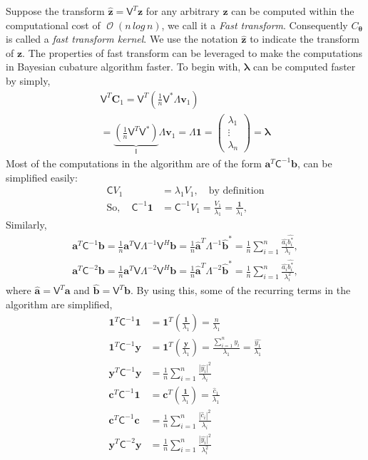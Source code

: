\documentclass[twocolumn]{svjour3}          %
\DeclareMathOperator{\Order}{{\mathcal O}}
\newcommand{\bm}[1]{\boldsymbol{#1}}
\newcommand{\vlambda}{{\bm{\lambda}}}
\newcommand{\vtheta}{{\bm{\theta}}}
\newcommand{\va}{\bm{a}}
\newcommand{\vb}{\bm{b}}
\newcommand{\vc}{\bm{c}}
\newcommand{\vC}{\bm{C}}
\newcommand{\vv}{\bm{v}}
\newcommand{\vy}{\bm{y}}
\newcommand{\vz}{\bm{z}}
\newcommand{\vone}{\bm{1}}
\newcommand{\mC}{\mathsf{C}}
\newcommand{\mCInv}{{\mathsf{C}^{-1}}}
\newcommand{\mLambda}{\mathsf{\Lambda}}
\newcommand{\mLambdaInv}{\mathsf{\Lambda}^{-1}}
\newcommand{\mV}{\mathsf{V}}
\def\abs#1{\ensuremath{\left \lvert #1 \right \rvert}}
\begin{document}
Suppose the transform $\hat{\vz} = \mV^T \vz$ for any arbitrary $\vz$ can be computed within the computational cost of $\Order( n \, log\, n)$, we call it a \emph{Fast transform}. Consequently $C_{\vtheta}$ is called a \emph{fast transform kernel}.
We use the notation $\hat{\vz}$ to indicate the transform of $\vz$.
The properties of fast transform can be leveraged to make the computations in Bayesian cubature algorithm faster. To begin with, $\vlambda$ can be computed faster by simply,
\begin{multline}
\label{eqn:fast_trasnform_to_eigvalues}
\mV^T \vC_1 = \mV^T \left( \frac 1n \mV^* \mLambda \vv_1 \right) 
\\
=
\underbrace{\left( \frac 1n \mV^T  \mV^* \right) }_{\mathsf{I}} \mLambda \vv_1  =  \mLambda \vone =
\begin{pmatrix}
\lambda_1 \\ \vdots \\ \lambda_n
\end{pmatrix} = \vlambda
\end{multline}
Most of the computations in the algorithm are of the form $\va^T\mCInv\vb$, can be simplified easily:
\begin{align*}
\mC V_1 &= \lambda_1 V_1 , \quad \text{by definition}
\\
\text{So}, \quad
\mCInv \vone &= \mCInv V_1 = \frac{V_1}{\lambda_1} = \frac{\vone}{\lambda_1} , 
\end{align*}
Similarly, 
\begin{multline*}
\va^T\mCInv\vb = \frac 1n \va^T \mV \mLambdaInv \mV^H \vb
= \frac 1n \widehat{\va}^T\mLambdaInv \widehat{\vb}^*
= \frac 1n \sum_{i=1}^n \frac{\widehat{a_i} \widehat{b_i^*}}{\lambda_i},
\\
\va^T\mC^{-2}\vb = \frac 1n \va^T \mV \mLambda^{-2} \mV^H \vb
= \frac 1n \widehat{\va}^T\mLambda^{-2} \widehat{\vb}^*
= \frac 1n \sum_{i=1}^n \frac{\widehat{a_i} \widehat{b_i^*}}{\lambda_i^2},
\end{multline*}
where $\widehat{\va} = \mV^T \va$ and $\widehat{\vb} = \mV^T \vb$. By using this, some of the recurring terms in the algorithm are simplified,
\begin{align*}
\vone^T\mCInv\vone &= \vone^T \left(\frac{\vone}{\lambda_1}\right) = \frac{n}{\lambda_1}
\\
\vone^T\mCInv\vy &= \vone^T \left( \frac{\vy}{\lambda_1} \right) = \frac{\sum_{i=1}^n y_i}{\lambda_1} = \frac{\widehat{y_1}}{\lambda_1}
\\
\vy^T\mCInv \vy &= \frac 1n \sum_{i=1}^n \frac{\abs{\widehat{y_i}}^2}{\lambda_i}
\\
\vc^T\mCInv \vone &= \vc^T \left(\frac{ \vone }{\lambda_1} \right) = \frac{\widehat{c}_1}{\lambda_1}
\\
\vc^T\mCInv \vc &= \frac 1n \sum_{i=1}^n \frac{\abs{\widehat{c}_i}^2}{\lambda_i}
\\
\vy^T\mC^{-2} \vy &= \frac 1n \sum_{i=1}^n \frac{\abs{\widehat{y_i}}^2}{\lambda_i^2}
\end{align*}
\end{document}
